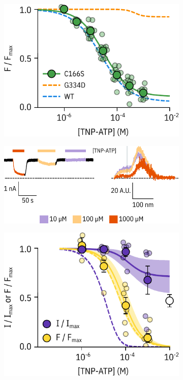 \begin{figure}[h]
\begin{subfigure}[t]{0.3\textwidth}
	\end{subfigure}
	\hfill
	\begin{subfigure}[t]{0.6\textwidth}
		\caption{}\label{ch5fig:c166s_unroofed}
		\centering
		\includegraphics[width=\textwidth]{c166s_2.pdf}
	\end{subfigure}
	\vfill
	\begin{subfigure}[t]{0.45\textwidth}
		\caption{}\label{ch5fig:c166s_traces}
		\centering
		\includegraphics[width=\textwidth]{c166s_3.pdf}
	\end{subfigure}
	\hfill
	\begin{subfigure}[t]{0.45\textwidth}
		\caption{}\label{ch5fig:c166s_mwc_fit_1}
		\centering
		\includegraphics[width=\textwidth]{mwc_c166s_1.pdf}

\end{subfigure}
\end{figure}
